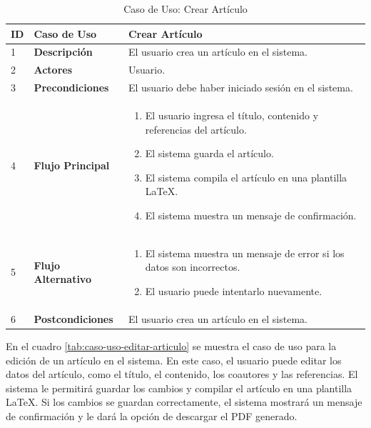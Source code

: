 \begin{table}[H]
    \centering
        \begin{tabular}{|p{0.5cm}|p{3.5cm}|p{10cm}|}
        \hline
        \textbf{ID} & \textbf{Caso de Uso} & \textbf{Crear Artículo} \\
        \hline
        1 & \textbf{Descripción} & El usuario crea un artículo en el sistema. \\
        \hline
        2 & \textbf{Actores} & Usuario. \\
        \hline
        3 & \textbf{Precondiciones} & El usuario debe haber iniciado sesión en el sistema. \\
        \hline
        4 & \textbf{Flujo Principal} & 
        \begin{enumerate}
            \item El usuario ingresa el título, contenido y referencias del artículo.
            \item El sistema guarda el artículo.
            \item El sistema compila el artículo en una plantilla LaTeX.
            \item El sistema muestra un mensaje de confirmación.
        \end{enumerate} \\
        \hline
        5 & \textbf{Flujo Alternativo} & 
        \begin{enumerate}
            \item El sistema muestra un mensaje de error si los datos son incorrectos.
            \item El usuario puede intentarlo nuevamente.
        \end{enumerate} \\
        \hline
        6 & \textbf{Postcondiciones} & El usuario crea un artículo en el sistema. \\
        \hline
    \end{tabular}
    \caption{Caso de Uso: Crear Artículo}
    \label{tab:caso-uso-crear-articulo}

\end{table}

En el cuadro \ref{tab:caso-uso-editar-articulo} se muestra el caso de uso para la edición de un artículo en el sistema. En este caso, el usuario puede editar los datos del artículo, como el título, el contenido, los coautores y las referencias. El sistema le permitirá guardar los cambios y compilar el artículo en una plantilla LaTeX. Si los cambios se guardan correctamente, el sistema mostrará un mensaje de confirmación y le dará la opción de descargar el PDF generado.

